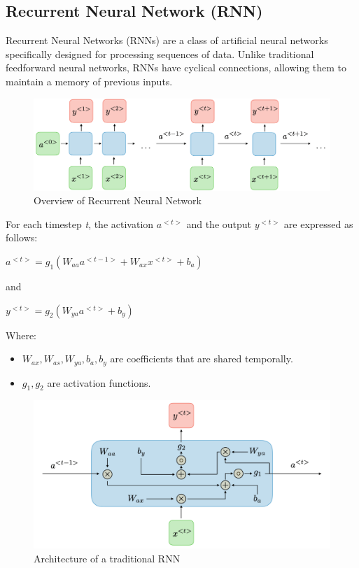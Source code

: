 \documentclass{ieeeojies}
\begin{document}
\subsection{Recurrent Neural Network (RNN)}
Recurrent Neural Networks (RNNs) are a class of artificial neural networks specifically designed for processing sequences of data. Unlike traditional feedforward neural networks, RNNs have cyclical connections, allowing them to maintain a memory of previous inputs.
\begin{figure}[H]
	\centering
	\begin{minipage}{0.32\textwidth}
		\centering
		\includegraphics[width=1\textwidth]{bibliography/Images/RNN_Img1.png}
		\caption{Overview of Recurrent Neural Network}
		\label{fig:1}
	\end{minipage}
\end{figure}
For each timestep \textit{t}, the activation $a^{<t>}$ and the output $y^{<t>}$ are expressed as follows:
\newline \centerline{$a^{<t>} = g_{1}(W_{aa}a^{<t-1>} + W_{ax}x^{<t>} + b_{a})$}
\newline and
\newline \centerline{$y^{<t>} = g_{2}(W_{ya}a^{<t>} +b_{y})$}
\newline Where:
\begin{itemize}
	\item $W_{ax}, W_{as}, W_{ya}, b_{a}, b_{y}$ are coefficients that are shared temporally.
	\item $g_{1}, g_{2}$ are activation functions.
\end{itemize}
\begin{figure}[H]
	\centering
	\begin{minipage}{0.32\textwidth}
		\centering
		\includegraphics[width=1\textwidth]{bibliography/Images/RNN_Img2.png}
		\caption{Architecture of a traditional RNN}
		\label{fig:1}
	\end{minipage}
\end{figure}
\end{document}
